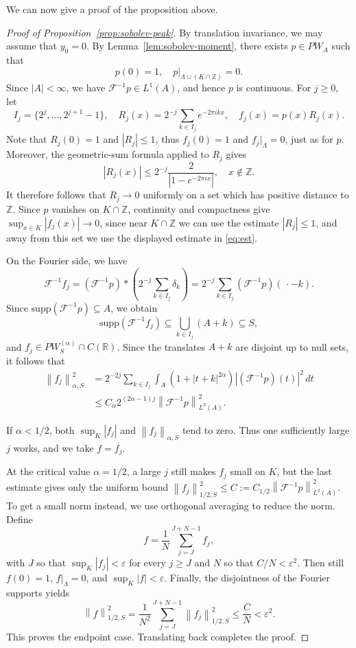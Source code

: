 \documentclass[reqno,a4paper,12pt]{amsart}
\numberwithin{equation}{section}
\def\Z{{\mathbb Z}}
\def\R{{\mathbb R}}
\newcommand{\supp}{{\mathrm{supp}}}
\newcommand\1{\mathds{1}}
\newcommand{\ift}{{\mathcal{F}^{-1}}}
\newcommand{\norm}[1]{\left\lVert #1 \right\rVert}
\begin{document}
We can now give a proof of the proposition above.

\begin{proof}[Proof of Proposition~\ref{prop:sobolev-peak}]
By translation invariance, we may assume that \(y_0=0\). By Lemma~\ref{lem:sobolev-moment}, there exists \(p\in PW_A\) such that
\[
    p(0)=1,
    \quad p|_{\Lambda\cup(K\cap\Z)}=0.
\]
Since \(|A|<\infty\), we have \(\ift p\in L^1(A)\), and hence \(p\) is
continuous. For \(j\geq0\), let
\[
    I_j=\{2^j,\ldots,2^{j+1}-1\},\quad
    R_j(x)=2^{-j}\sum_{k\in I_j}e^{-2\pi ikx},\quad
    f_j(x)=p(x)R_j(x).
\]
Note that \(R_j(0)=1\) and \(|R_j|\leq1\), thus \(f_j(0)=1\) and \(f_j|_\Lambda=0\), just as for $p$. Moreover, the
geometric-sum formula applied to \(R_j\) gives
\begin{equation}\label{eq:est}
    |R_j(x)|\leq 2^{-j}\frac{2}{|1-e^{-2\pi ix}|},
    \quad x\notin\Z.
\end{equation}
It therefore follows that \(R_j\to0\) uniformly on a set which has positive distance to \(\Z\). Since \(p\) vanishes on
\(K\cap\Z\), continuity and compactness give
\(\sup_{x\in K}|f_j(x)|\to0\), since near \(K\cap\Z\) we can use the estimate \(|R_j|\leq1\),
and away from this set we use the displayed estimate in \eqref{eq:est}.

On the Fourier side, we have
\[
    \ift f_j
    =(\ift p)*\left(2^{-j}\sum_{k\in I_j}\delta_k\right)
    =2^{-j}\sum_{k\in I_j}(\ift p)(\,\cdot-k).
\]
Since \(\supp(\ift p)\subseteq A\), we obtain
\[
    \supp(\ift f_j)\subseteq\bigcup_{k\in I_j}(A+k)\subseteq S,
\]
and \(f_j\in PW^{(\alpha)}_S\cap C(\R)\). Since the translates \(A+k\) are
disjoint up to null sets, it follows that
\begin{align*}
    \norm{f_j}_{\alpha,S}^2
    &=2^{-2j}\sum_{k\in I_j}
      \int_A(1+|t+k|^{2\alpha})|(\ift p)(t)|^2\,dt \\
    &\leq C_\alpha 2^{(2\alpha-1)j}\norm{\ift p}_{L^2(A)}^2.
\end{align*}

If \(\alpha<1/2\), both \(\sup_K|f_j|\) and
\(\norm{f_j}_{\alpha,S}\) tend to zero. Thus one sufficiently large \(j\)
works, and we take \(f=f_j\).

At the critical value \(\alpha=1/2\), a large \(j\) still makes \(f_j\) small on
\(K\), but the last estimate gives only the uniform bound
\(\norm{f_j}_{1/2,S}^2\leq C:=C_{1/2}\norm{\ift p}_{L^2(A)}^2\).
To get a small norm instead, we use orthogonal averaging to reduce the norm. Define
\[
    f=\frac1N\sum_{j=J}^{J+N-1}f_j,
\]
with \(J\) so that \(\sup_K|f_j|<\varepsilon\) for every \(j\geq J\) and
\(N\) so that \(C/N<\varepsilon^2\). Then still \(f(0)=1\),
\(f|_\Lambda=0\), and \(\sup_K|f|<\varepsilon\). Finally, the disjointness
of the Fourier supports yields
\[
    \norm{f}_{1/2,S}^2
    =\frac1{N^2}\sum_{j=J}^{J+N-1}\norm{f_j}_{1/2,S}^2
    \leq\frac{C}{N}<\varepsilon^2.
\]
This proves the endpoint case. Translating back completes the proof.
\end{proof}
\end{document}
